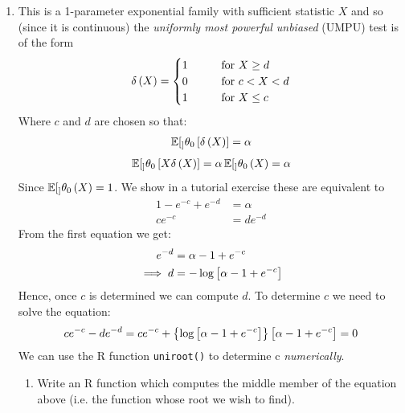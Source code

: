\documentclass[12pt, a4paper]{article}\usepackage[]{graphicx}\usepackage[]{color}
\begin{document}
\begin{enumerate}[label = {\bfseries \arabic*.}]
\begin{enumerate}[label = (\alph*)]
{    }
    \item This is a 1-parameter exponential family with sufficient statistic $X$ and so (since it is continuous) the \textit{uniformly most powerful unbiased} (UMPU) test is of the form
    \begin{align}
    \delta\left(X\right) = 
      \begin{cases}
      1 &\qquad\text{for } X \ge d \\
      0 &\qquad\text{for } c < X < d\\
      1 &\qquad \text{for } X \le c
      \end{cases}
    \end{align}
Where $c$ and $d$ are chosen so that:
  \begin{align}
    \operatorname{\mathbb{E}}[_]{\theta_0}\left[\delta\left(X\right)\right] = \alpha
  \end{align}
  \begin{align}
  \operatorname{\mathbb{E}}[_]{\theta_0}\left[X\delta\left(X\right)\right] = \alpha\operatorname{\mathbb{E}}[_]{\theta_0}\left(X\right) = \alpha
  \end{align}
  Since $\operatorname{\mathbb{E}}[_]{\theta_0}\left(X\right) = 1$. We show in a tutorial exercise these are equivalent to
  \begin{align*}
  1 - e^{-c} + e^{-d} & = \alpha \\
  ce^{-c} & = de^{-d}
  \end{align*}
  From the first equation we get:
  \begin{align*}
  e^{-d} & = \alpha - 1 + e^{-c} \\
  \implies d & = -\log \left[\alpha -1 + e^{-c}\right]
  \end{align*}
  Hence, once $c$ is determined we can compute $d$. To determine $c$ we need to solve the equation:
  \begin{align*}
  ce^{-c} - de^{-d} = ce^{-c} + \left\{\log \left[\alpha - 1 + e^{-c}\right]\right\}\left[\alpha - 1 + e^{-c}\right] = 0
  \end{align*}
  We can use the R function \verb+uniroot()+ to determine c \textit{numerically}.
    \begin{enumerate}[label=(\roman*)]
      \item Write an R function which computes the middle member of the equation above (i.e. the function whose root we wish to find).
      
      {\setlength{\leftskip}{3ex}
      
}
\end{enumerate}
\end{enumerate}
\end{enumerate}
\end{document}
